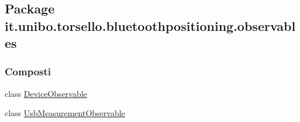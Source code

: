 \hypertarget{namespaceit_1_1unibo_1_1torsello_1_1bluetoothpositioning_1_1observables}{}\subsection{Package it.\+unibo.\+torsello.\+bluetoothpositioning.\+observables}
\label{namespaceit_1_1unibo_1_1torsello_1_1bluetoothpositioning_1_1observables}
\subsubsection*{Composti}
\begin{DoxyCompactItemize}
\item 
class \hyperlink{classit_1_1unibo_1_1torsello_1_1bluetoothpositioning_1_1observables_1_1DeviceObservable}{Device\+Observable}
\item 
class \hyperlink{classit_1_1unibo_1_1torsello_1_1bluetoothpositioning_1_1observables_1_1UsbMeasurementObservable}{Usb\+Measurement\+Observable}
\end{DoxyCompactItemize}
